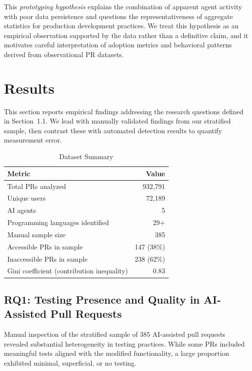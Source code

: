 \documentclass[conference]{IEEEtran}
\begin{document}
This \textit{prototyping hypothesis} explains the combination of apparent agent activity with poor data persistence and questions the representativeness of aggregate statistics for production development practices. We treat this hypothesis as an empirical observation supported by the data rather than a definitive claim, and it motivates careful interpretation of adoption metrics and behavioral patterns derived from observational PR datasets.

\section{Results}

This section reports empirical findings addressing the research questions defined in Section~1.1. We lead with manually validated findings from our stratified sample, then contrast these with automated detection results to quantify measurement error.

\begin{table}[t]
\centering
\caption{Dataset Summary}
\label{tab:dataset_summary}
\begin{tabular}{@{}lr@{}}
\toprule
\textbf{Metric} & \textbf{Value} \\
\midrule
Total PRs analyzed & 932,791 \\
Unique users & 72,189 \\
AI agents & 5 \\
Programming languages identified & 29+ \\
Manual sample size & 385 \\
Accessible PRs in sample & 147 (38\%) \\
Inaccessible PRs in sample & 238 (62\%) \\
Gini coefficient (contribution inequality) & 0.83 \\
\bottomrule
\end{tabular}
\end{table}

\subsection{RQ1: Testing Presence and Quality in AI-Assisted Pull Requests}

Manual inspection of the stratified sample of 385 AI-assisted pull requests revealed substantial heterogeneity in testing practices. While some PRs included meaningful tests aligned with the modified functionality, a large proportion exhibited minimal, superficial, or no testing.
\end{document}
